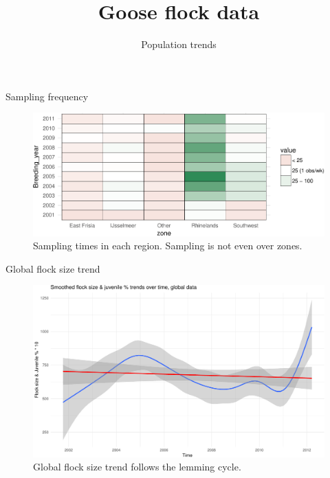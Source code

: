 \documentclass[10pt,ignorenonframetext,]{beamer}
\title{Goose flock data}
\subtitle{Population trends}
\date{}
\begin{document}
\frame{\titlepage}

\begin{frame}{Sampling frequency}

\begin{figure}[htbp]
\centering
\includegraphics{goose_code008pres_files/figure-beamer/tilemap_space_time-1.pdf}
\caption{Sampling times in each region. Sampling is not even over
zones.}
\end{figure}

\end{frame}

\begin{frame}{Global flock size trend}

\begin{figure}[htbp]
\centering
\includegraphics{goose_code008pres_files/figure-beamer/trend_flock_juv_global-1.pdf}
\caption{Global flock size trend follows the lemming cycle.}
\end{figure}

\end{frame}
\end{document}
